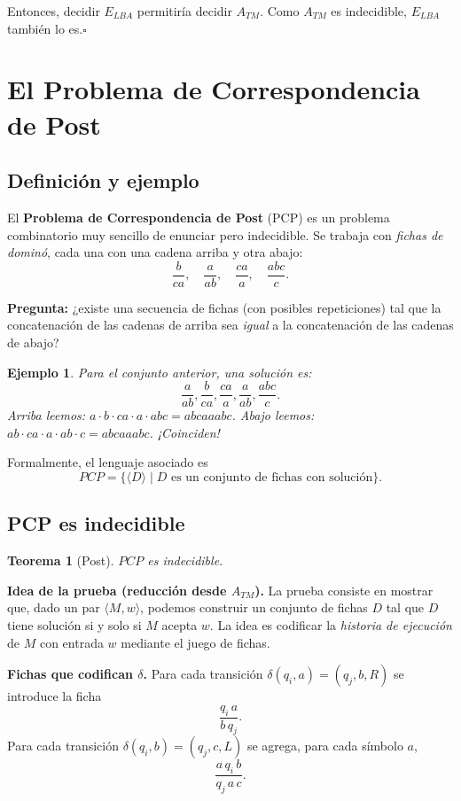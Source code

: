 \documentclass[11pt,a4paper]{article}
\theoremstyle{definicion}
\newtheorem{teorema}[definicion]{Teorema}
\newtheorem{ejemplo}[definicion]{Ejemplo}
\newcommand{\enc}[1]{\langle #1 \rangle}
\begin{document}
Entonces, decidir $E_{LBA}$ permitiría decidir $A_{TM}$. Como $A_{TM}$ es indecidible, $E_{LBA}$ también lo es.\hfill$\square$

\section{El Problema de Correspondencia de Post}

\subsection{Definición y ejemplo}

El \textbf{Problema de Correspondencia de Post} (PCP) es un problema combinatorio muy sencillo de enunciar pero indecidible. Se trabaja con \emph{fichas de dominó}, cada una con una cadena arriba y otra abajo:
\[
\frac{b}{ca}, \quad \frac{a}{ab}, \quad \frac{ca}{a}, \quad \frac{abc}{c}.
\]

\textbf{Pregunta:} ¿existe una secuencia de fichas (con posibles repeticiones) tal que la concatenación de las cadenas de arriba sea \emph{igual} a la concatenación de las cadenas de abajo?

\begin{ejemplo}
Para el conjunto anterior, una solución es:
\[
\frac{a}{ab}, \frac{b}{ca}, \frac{ca}{a}, \frac{a}{ab}, \frac{abc}{c}.
\]
Arriba leemos: $a \cdot b \cdot ca \cdot a \cdot abc = abcaaabc$. Abajo leemos: $ab \cdot ca \cdot a \cdot ab \cdot c = abcaaabc$. ¡Coinciden!
\end{ejemplo}

Formalmente, el lenguaje asociado es
\[
PCP = \{ \enc{D} \mid D \text{ es un conjunto de fichas con solución} \}.
\]

\subsection{PCP es indecidible}

\begin{teorema}[Post]
$PCP$ es indecidible.
\end{teorema}

\textbf{Idea de la prueba (reducción desde $A_{TM}$).} La prueba consiste en mostrar que, dado un par $\enc{M, w}$, podemos construir un conjunto de fichas $D$ tal que $D$ tiene solución si y solo si $M$ acepta $w$. La idea es codificar la \emph{historia de ejecución} de $M$ con entrada $w$ mediante el juego de fichas.

\textbf{Fichas que codifican $\delta$.} Para cada transición $\delta(q_i, a) = (q_j, b, R)$ se introduce la ficha
\[
\frac{q_i\, a}{b\, q_j}.
\]
Para cada transición $\delta(q_i, b) = (q_j, c, L)$ se agrega, para cada símbolo $a$,
\[
\frac{a\, q_i\, b}{q_j\, a\, c}.
\]
\end{document}
